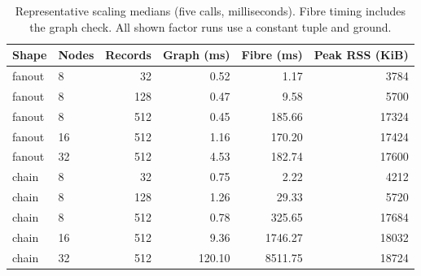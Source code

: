 \begin{table}[htbp]
\centering\small
\caption{Representative scaling medians (five calls, milliseconds). Fibre timing includes the graph check. All shown factor runs use a constant tuple and ground.}\label{ex:tab:scaling}
\begin{tabular}{@{}llrrrr@{}}
\toprule
Shape & Nodes & Records & Graph (ms) & Fibre (ms) & Peak RSS (KiB) \\
\midrule
fanout & 8 & 32 & 0.52 & 1.17 & 3784 \\
fanout & 8 & 128 & 0.47 & 9.58 & 5700 \\
fanout & 8 & 512 & 0.45 & 185.66 & 17324 \\
fanout & 16 & 512 & 1.16 & 170.20 & 17424 \\
fanout & 32 & 512 & 4.53 & 182.74 & 17600 \\
chain & 8 & 32 & 0.75 & 2.22 & 4212 \\
chain & 8 & 128 & 1.26 & 29.33 & 5720 \\
chain & 8 & 512 & 0.78 & 325.65 & 17684 \\
chain & 16 & 512 & 9.36 & 1746.27 & 18032 \\
chain & 32 & 512 & 120.10 & 8511.75 & 18724 \\
\bottomrule
\end{tabular}
\end{table}
